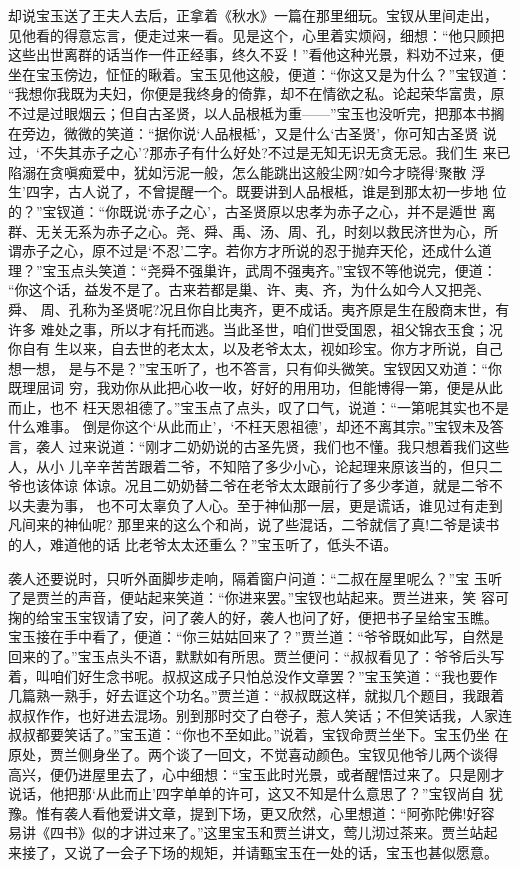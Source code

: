却说宝玉送了王夫人去后，正拿着《秋水》一篇在那里细玩。宝钗从里间走出，
见他看的得意忘言，便走过来一看。见是这个，心里着实烦闷，细想：“他只顾把
这些出世离群的话当作一件正经事，终久不妥！”看他这种光景，料劝不过来，便
坐在宝玉傍边，怔怔的瞅着。宝玉见他这般，便道：“你这又是为什么？”宝钗道：
“我想你我既为夫妇，你便是我终身的倚靠，却不在情欲之私。论起荣华富贵，原
不过是过眼烟云；但自古圣贤，以人品根柢为重——”宝玉也没听完，把那本书搁
在旁边，微微的笑道：“据你说‘人品根柢’，又是什么‘古圣贤’，你可知古圣贤
说过，‘不失其赤子之心’?那赤子有什么好处?不过是无知无识无贪无忌。我们生
来已陷溺在贪嗔痴爱中，犹如污泥一般，怎么能跳出这般尘网?如今才晓得‘聚散
浮生’四字，古人说了，不曾提醒一个。既要讲到人品根柢，谁是到那太初一步地
位的？”宝钗道：“你既说‘赤子之心’，古圣贤原以忠孝为赤子之心，并不是遁世
离群、无关无系为赤子之心。尧、舜、禹、汤、周、孔，时刻以救民济世为心，所
谓赤子之心，原不过是‘不忍’二字。若你方才所说的忍于抛弃天伦，还成什么道
理？”宝玉点头笑道：“尧舜不强巢许，武周不强夷齐。”宝钗不等他说完，便道：
“你这个话，益发不是了。古来若都是巢、许、夷、齐，为什么如今人又把尧、舜、
周、孔称为圣贤呢?况且你自比夷齐，更不成话。夷齐原是生在殷商末世，有许多
难处之事，所以才有托而逃。当此圣世，咱们世受国恩，祖父锦衣玉食；况你自有
生以来，自去世的老太太，以及老爷太太，视如珍宝。你方才所说，自己想一想，
是与不是？”宝玉听了，也不答言，只有仰头微笑。宝钗因又劝道：“你既理屈词
穷，我劝你从此把心收一收，好好的用用功，但能博得一第，便是从此而止，也不
枉天恩祖德了。”宝玉点了点头，叹了口气，说道：“一第呢其实也不是什么难事。
倒是你这个‘从此而止’，‘不枉天恩祖德’，却还不离其宗。”宝钗未及答言，袭人
过来说道：“刚才二奶奶说的古圣先贤，我们也不懂。我只想着我们这些人，从小
儿辛辛苦苦跟着二爷，不知陪了多少小心，论起理来原该当的，但只二爷也该体谅
体谅。况且二奶奶替二爷在老爷太太跟前行了多少孝道，就是二爷不以夫妻为事，
也不可太辜负了人心。至于神仙那一层，更是谎话，谁见过有走到凡间来的神仙呢?
那里来的这么个和尚，说了些混话，二爷就信了真!二爷是读书的人，难道他的话
比老爷太太还重么？”宝玉听了，低头不语。

袭人还要说时，只听外面脚步走响，隔着窗户问道：“二叔在屋里呢么？”宝
玉听了是贾兰的声音，便站起来笑道：“你进来罢。”宝钗也站起来。贾兰进来，笑
容可掬的给宝玉宝钗请了安，问了袭人的好，袭人也问了好，便把书子呈给宝玉瞧。
宝玉接在手中看了，便道：“你三姑姑回来了？”贾兰道：“爷爷既如此写，自然是
回来的了。”宝玉点头不语，默默如有所思。贾兰便问：“叔叔看见了：爷爷后头写
着，叫咱们好生念书呢。叔叔这成子只怕总没作文章罢？”宝玉笑道：“我也要作
几篇熟一熟手，好去诓这个功名。”贾兰道：“叔叔既这样，就拟几个题目，我跟着
叔叔作作，也好进去混场。别到那时交了白卷子，惹人笑话；不但笑话我，人家连
叔叔都要笑话了。”宝玉道：“你也不至如此。”说着，宝钗命贾兰坐下。宝玉仍坐
在原处，贾兰侧身坐了。两个谈了一回文，不觉喜动颜色。宝钗见他爷儿两个谈得
高兴，便仍进屋里去了，心中细想：“宝玉此时光景，或者醒悟过来了。只是刚才
说话，他把那‘从此而止’四字单单的许可，这又不知是什么意思了？”宝钗尚自
犹豫。惟有袭人看他爱讲文章，提到下场，更又欣然，心里想道：“阿弥陀佛!好容
易讲《四书》似的才讲过来了。”这里宝玉和贾兰讲文，莺儿沏过茶来。贾兰站起
来接了，又说了一会子下场的规矩，并请甄宝玉在一处的话，宝玉也甚似愿意。

